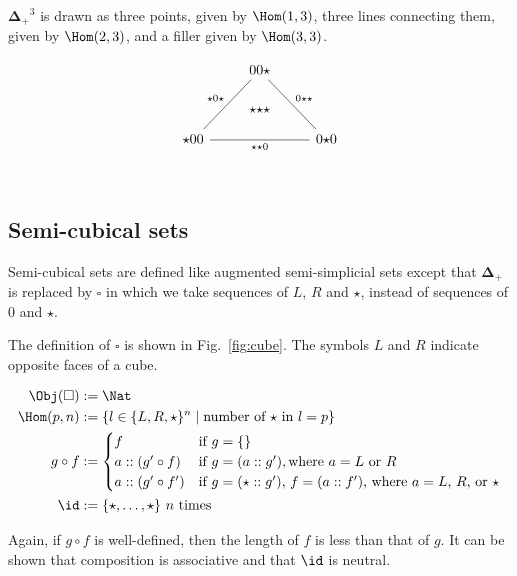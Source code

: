 \documentclass[10pt]{art.cls/art}
\newcommand{\DeltaPlus}{\ensuremath{\boldsymbol{\Delta}_+}}
\newcommand{\Cube}{\ensuremath{\boldsymbol{\square}}}
\newcommand{\kstar}{{\star}}
\begin{document}
\begin{example}[$\DeltaPlus^3$]
  $\DeltaPlus^3$ is drawn as three points, given by $\Hom(1, 3)$, three lines connecting them, given by $\Hom(2, 3)$, and a filler given by $\Hom(3, 3)$.

  \begin{equation*}
    \begin{tikzcd}
      & |[alias=F]|00\kstar \arrow[ddr, dash, "0\kstar\kstar"] & \\\\
      \kstar00 \arrow[rr, dash, "\kstar\kstar0"{name=T, below}]\arrow[uur, dash, "\kstar0\kstar"] && 0\kstar0 \\
      \arrow[rightarrow, from=F, to=T, phantom, "\kstar\kstar\kstar" description]
    \end{tikzcd}
  \end{equation*}
\end{example}

\subsection{Semi-cubical sets}
Semi-cubical sets are defined like augmented semi-simplicial sets except that $\DeltaPlus$ is replaced by $\Cube$ in which we take sequences of $L$, $R$ and $\star$, instead of sequences of $0$ and $\kstar$.

\begin{definition}[\Cube]
  The definition of $\Cube$ is shown in Fig.~\ref{fig:cube}. The symbols $L$ and $R$ indicate opposite faces of a cube.
  \begin{figure*}[!t]
    \begin{align*}
      \Obj(\Cube) & := \Nat                                                                                \\
      \Hom(p, n)  & := \{l \in \{L, R, \kstar\}^n \mid \text{number of $\kstar$ in $l = p$}\}              \\
      g \circ f   & :=
      \begin{cases}
        f                  & \text{if $g = \{\}$}                                                            \\
        a :: (g' \circ f)  & \text{if $g = (a :: g')$}, \text{where $a = L$ or $R$}                          \\
        a :: (g' \circ f') & \text{if $g = (\star :: g')$, $f = (a :: f')$, where $a = L$, $R$, or $\kstar$} \\
      \end{cases} \\
      \id         & := \{\kstar, \ldots, \kstar\} \text{ $n$ times}
    \end{align*}
    \caption{Definition of \Cube}\label{fig:cube}
  \end{figure*}

  Again, if $g \circ f$ is well-defined, then the length of $f$ is less than that of $g$. It can be shown that composition is associative and that $\id$ is neutral.
\end{definition}
\end{document}
